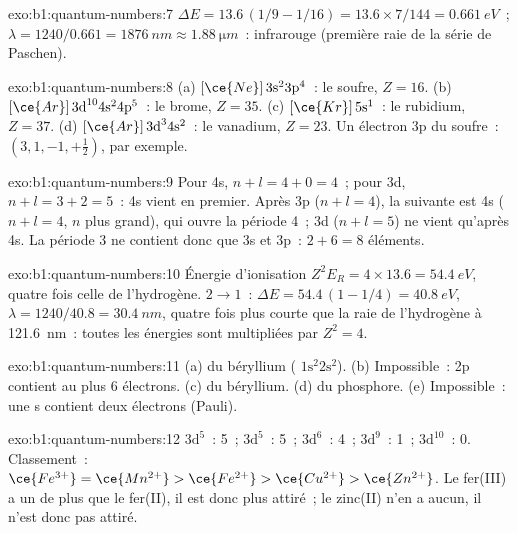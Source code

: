 \begin{solution}{exo:b1:quantum-numbers:7}
$\Delta E = 13.6\,(1/9 - 1/16) = 13.6 \times 7/144 = \qty{0.661}{eV}$~;
$\lambda = 1240/0.661 = \qty{1876}{nm} \approx \qty{1.88}{\micro m}$~:
infrarouge (première raie de la série de Paschen).
\end{solution}

\begin{solution}{exo:b1:quantum-numbers:8}
(a) $[\ce{Ne}]\,3\text{s}^2 3\text{p}^4$~: le soufre, $Z = 16$.
(b) $[\ce{Ar}]\,3\text{d}^{10} 4\text{s}^2 4\text{p}^5$~: le brome, $Z = 35$.
(c) $[\ce{Kr}]\,5\text{s}^1$~: le rubidium, $Z = 37$.
(d) $[\ce{Ar}]\,3\text{d}^3 4\text{s}^2$~: le vanadium, $Z = 23$.
Un électron 3p du soufre~: $(3, 1, -1, +\tfrac12)$, par exemple.
\end{solution}

\begin{solution}{exo:b1:quantum-numbers:9}
Pour 4s, $n + l = 4 + 0 = 4$~; pour 3d, $n + l = 3 + 2 = 5$~: 4s vient
en premier. Après 3p ($n + l = 4$), la  suivante est 4s
($n + l = 4$, $n$ plus grand), qui ouvre la période 4~; 3d ($n + l = 5$)
ne vient qu'après 4s. La période 3 ne contient donc que 3s et 3p~:
$2 + 6 = 8$ éléments.
\end{solution}

\begin{solution}{exo:b1:quantum-numbers:10}
Énergie d'ionisation $Z^2E_R = 4 \times 13.6 = \qty{54.4}{eV}$, quatre
fois celle de l'hydrogène. $2 \to 1$~: $\Delta E = 54.4\,(1 - 1/4) = \qty{40.8}{eV}$,
$\lambda = 1240/40.8 = \qty{30.4}{nm}$, quatre fois plus courte que la
raie de l'hydrogène à \qty{121.6}{nm}~: toutes les énergies sont
multipliées par $Z^2 = 4$.
\end{solution}

\begin{solution}{exo:b1:quantum-numbers:11}
(a)  du béryllium ( $1\text{s}^2 2\text{s}^2$).
(b) Impossible~: 2p contient au plus 6 électrons. (c)  du
béryllium. (d)  du phosphore. (e) Impossible~: une
 s contient deux électrons (Pauli).
\end{solution}

\begin{solution}{exo:b1:quantum-numbers:12}
 $3\text{d}^5$~: 5~;  $3\text{d}^5$~: 5~; 
$3\text{d}^6$~: 4~;  $3\text{d}^9$~: 1~; 
$3\text{d}^{10}$~: 0. Classement~: $\ce{Fe^{3+}} = \ce{Mn^{2+}} > \ce{Fe^{2+}}
> \ce{Cu^{2+}} > \ce{Zn^{2+}}$. Le fer(III) a un 
de plus que le fer(II), il est donc plus attiré~; le zinc(II) n'en a
aucun, il n'est donc pas attiré.
\end{solution}

